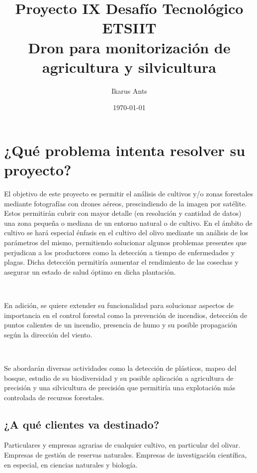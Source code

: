 \documentclass[11pt,spanish]{article} %
\title{Proyecto IX Desafío Tecnológico ETSIIT\\
		Dron para monitorización de agricultura y silvicultura }
\author{Ikarus Ants}
\date{\today}
\begin{document}
\maketitle
\tableofcontents %
\newpage
\setlength\parindent{0pt} %



\section{¿Qué problema intenta resolver su proyecto?}

El objetivo de este proyecto es permitir el análisis de cultivos y/o zonas forestales mediante fotografías con drones aéreos, prescindiendo de la imagen por satélite. Estos permitirán cubrir con mayor detalle (en resolución y cantidad de datos) una zona pequeña o mediana de un entorno natural o de cultivo. 
En el ámbito de cultivo se hará especial énfasis en el cultivo del olivo mediante un análisis de los parámetros del mismo, permitiendo solucionar algunos problemas presentes que perjudican a los productores como la detección a tiempo de enfermedades y plagas. Dicha detección permitiría aumentar el rendimiento de las cosechas y asegurar un estado de salud óptimo en dicha plantación. 

\

En adición, se quiere extender su funcionalidad para solucionar aspectos de importancia en el control forestal como la prevención de incendios, detección de puntos calientes de un incendio, presencia de humo y su posible propagación según la dirección del viento.

\

Se abordarán diversas actividades como la detección de plásticos, mapeo del bosque, estudio de su biodiversidad y su posible aplicación a agricultura de precisión y una silvicultura de precisión que permitiría una explotación más controlada de recursos forestales.


\subsection{¿A qué clientes va destinado?}
Particulares y empresas agrarias de cualquier cultivo, en particular del olivar.
Empresas de gestión de reservas naturales.
Empresas de investigación científica, en especial, en ciencias naturales y biología.
\end{document}
